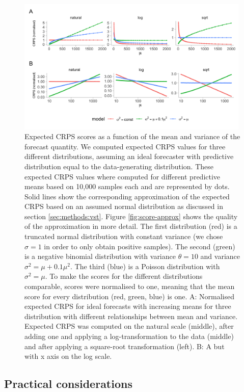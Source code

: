 \documentclass{article}
\begin{document}
\begin{figure}[h!]
    \centering
    \includegraphics[width=0.99\textwidth]{output/figures/SIM-mean-state-size.png}
    \caption{Expected CRPS scores as a function of the mean and variance of the forecast quantity. We computed expected CRPS values  for three different distributions, assuming an ideal forecaster with predictive distribution equal to the data-generating distribution. 
    These expected CRPS values where computed for different predictive means based on 10,000 samples each and are represented by dots. Solid lines show the corresponding approximation of the expected CRPS based on an assumed normal distribution as discussed in section \ref{sec:methods:vst}. Figure \ref{fig:score-approx} shows the quality of the approximation in more detail. 
    The first distribution (red) is a truncated normal distribution with constant variance (we chose $\sigma = 1$ in order to only obtain positive samples). The second (green) is a negative binomial distribution with variance $\theta = 10$ and variance $\sigma^2 = \mu + 0.1\mu^2$. The third (blue) is a
    Poisson distribution with $\sigma^2 = \mu$. To make the scores for the different distributions comparable, scores were normalised to one, meaning that the mean score for every distribution (red, green, blue) is one. 
    A: Normalised expected CRPS for ideal forecasts with increasing means for three distribution with different relationships between mean and variance. Expected CRPS was computed on the natural scale (middle), after adding one and applying a log-transformation to the data (middle) and after applying a square-root transformation (left). B: A but with x axis on the log scale.}
    \label{fig:SIM-wis-state-size-mean}
\end{figure}

\subsection{Practical considerations}
\label{sec:methods:considerations}
\end{document}
